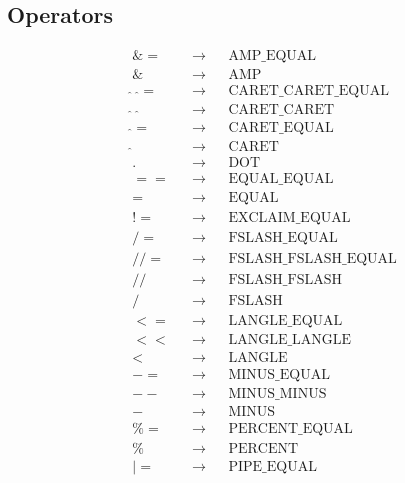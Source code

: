 \documentclass[]{article}
\begin{document}
\subsection{Operators}
\begin{align}
    &\&=                   &&\to &&\text{AMP\_EQUAL}            \\
    &\&                    &&\to &&\text{AMP}                   \\
    &\hat{}\enspace\hat{}= &&\to &&\text{CARET\_CARET\_EQUAL}   \\
    &\hat{}\enspace\hat{}  &&\to &&\text{CARET\_CARET}          \\
    &\hat{}=               &&\to &&\text{CARET\_EQUAL}          \\
    &\hat{}                &&\to &&\text{CARET}                 \\
    &.                     &&\to &&\text{DOT}                   \\
    &==                    &&\to &&\text{EQUAL\_EQUAL}          \\
    &=                     &&\to &&\text{EQUAL}                 \\
    &!=                    &&\to &&\text{EXCLAIM\_EQUAL}        \\
    &/=                    &&\to &&\text{FSLASH\_EQUAL}         \\
    &//=                   &&\to &&\text{FSLASH\_FSLASH\_EQUAL} \\
    &//                    &&\to &&\text{FSLASH\_FSLASH}        \\
    &/                     &&\to &&\text{FSLASH}                \\
    &<=                    &&\to &&\text{LANGLE\_EQUAL}         \\
    &<<                    &&\to &&\text{LANGLE\_LANGLE}        \\
    &<                     &&\to &&\text{LANGLE}                \\
    &-=                    &&\to &&\text{MINUS\_EQUAL}          \\
    &--                    &&\to &&\text{MINUS\_MINUS}          \\
    &-                     &&\to &&\text{MINUS}                 \\
    &\%=                   &&\to &&\text{PERCENT\_EQUAL}        \\
    &\%                    &&\to &&\text{PERCENT}               \\
    &|=                    &&\to &&\text{PIPE\_EQUAL}           \\

\end{align}
\end{document}
